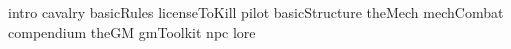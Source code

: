 \documentclass[11pt]{report}
\begin{document}
\addtocounter{page}{2}

\tableofcontents

\newpage
{intro}
{cavalry}
{basicRules}
{licenseToKill}
{pilot}
{basicStructure}
{theMech}
{mechCombat}
{compendium}
{theGM}
{gmToolkit}
{npc}
{lore}
\end{document}
